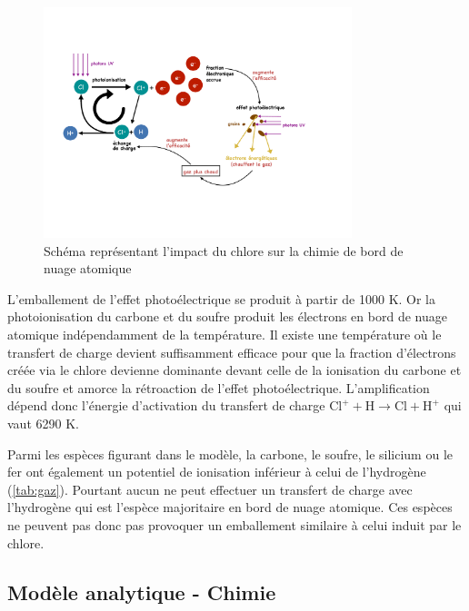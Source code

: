 \begin{figure}[b!]
   \centering
        \includegraphics[trim = {2cm 5cm 4cm 4cm},clip, width=0.8\textwidth]{figure/Cl/Cl_heating_fr-5.pdf}
    \caption{Schéma représentant l'impact du chlore sur la chimie de bord de nuage atomique}
    \label{fig:catalyseur}
\end{figure}{}

L'emballement de l'effet photoélectrique se produit à partir de 1000 K. Or la photoionisation du carbone et du soufre produit les électrons en bord de nuage atomique indépendamment de la température. Il existe une température où le transfert de charge devient suffisamment efficace pour que la fraction d'électrons créée via le chlore devienne dominante devant celle de la ionisation du carbone et du soufre et amorce la rétroaction de l'effet photoélectrique. L'amplification dépend donc l'énergie d'activation du transfert de charge $\mathrm{Cl}^+  + \mathrm{H}    \rightarrow \mathrm{Cl}   +  \mathrm{H}^+$ qui vaut 6290 K. \newline

Parmi les espèces figurant dans le modèle, la carbone, le soufre, le silicium ou le fer ont également un potentiel de ionisation inférieur à celui de l'hydrogène (\autoref{tab:gaz}). Pourtant aucun ne peut effectuer un transfert de charge avec l'hydrogène qui est l'espèce majoritaire en bord de nuage atomique. Ces espèces ne peuvent pas donc pas provoquer un emballement similaire à celui induit par le chlore. 




\subsection{Modèle analytique - Chimie}

